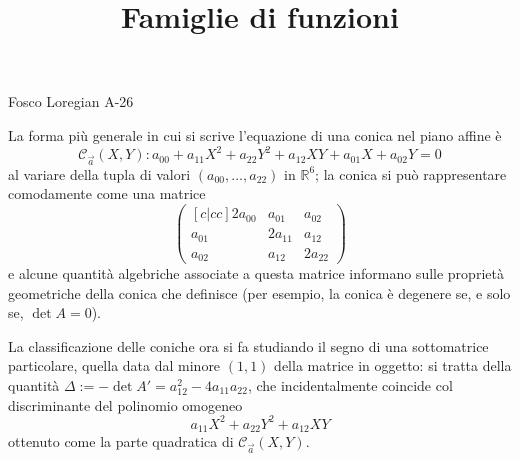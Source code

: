 \documentclass{amsart}
\author{}
\date{}
\title{Famiglie di funzioni}
\begin{document}
\maketitle
\noindent
Fosco Loregian \hfill A-26

La forma più generale in cui si scrive l'equazione di una conica nel piano affine è
\[\mathcal C_{\vec a}(X,Y) : a_{00} + a_{11}X^2 + a_{22}Y^2 + a_{12}XY + a_{01}X + a_{02}Y = 0\]
al variare della tupla di valori $(a_{00}, \dots, a_{22})$ in $\mathbb R^6$; la conica si può rappresentare comodamente come una matrice
\[
\begin{pmatrix}[c|cc]
  2 a_{00} & a_{01} & a_{02} \\
  \hline 
  a_{01} & 2 a_{11} & a_{12} \\
  a_{02} & a_{12} & 2 a_{22}
\end{pmatrix}
\]
e alcune quantità algebriche associate a questa matrice informano sulle proprietà geometriche della conica che definisce (per esempio, la conica è degenere se, e solo se, $\det A=0$).

La classificazione delle coniche ora si fa studiando il segno di una sottomatrice particolare, quella data dal minore $(1,1)$ della matrice in oggetto: si tratta della quantità $\Delta := -\det A' = a_{12}^2 - 4a_{11}a_{22}$, che incidentalmente coincide col discriminante del polinomio omogeneo
\[a_{11}X^2 + a_{22}Y^2 + a_{12}XY\]
ottenuto come la parte quadratica di $\mathcal C_{\vec a}(X,Y)$.
\end{document}
